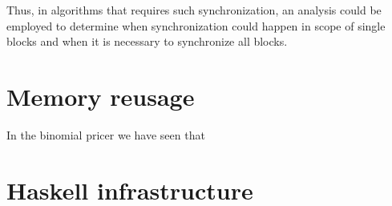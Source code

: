 Thus, in algorithms that requires such synchronization, an analysis
could be employed to determine when synchronization could happen in
scope of single blocks and when it is necessary to synchronize all
blocks.

\section{Memory reusage}
In the binomial pricer we have seen that 

\section{Haskell infrastructure}
\label{sec:haskell_infrastructure}

